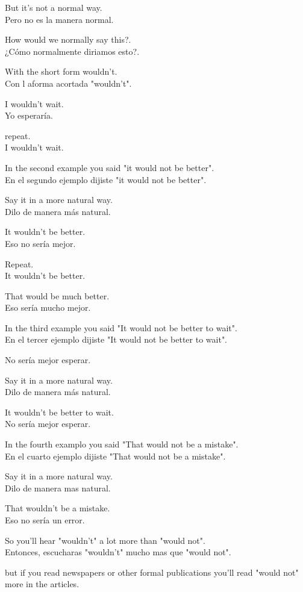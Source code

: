 But it's not a normal way.\\
Pero no es la manera normal.

How would we normally say this?.\\
¿Cómo normalmente diriamos esto?.

With the short form wouldn't.\\
Con l aforma acortada "wouldn't".

I wouldn't wait.\\
Yo esperaría.

repeat.\\
I wouldn't wait.

In the second example you said "it would not be better".\\
En el segundo ejemplo dijiste "it would not be better".

Say it in a more natural way.\\
Dilo de manera más natural.

It wouldn't be better.\\
Eso no sería mejor.

Repeat.\\
It wouldn't be better.

That would be much better.\\
Eso sería mucho mejor.

In the third example you said "It would not be better to wait".\\
En el tercer ejemplo dijiste "It would not be better to wait".

No sería mejor esperar.

Say it in a more natural way.\\
Dilo de manera más natural.

It wouldn't be better to wait.\\
No sería mejor esperar.

In the fourth examplo you said "That would not be a mistake".\\
En el cuarto ejemplo dijiste "That would not be a mistake".

Say it in a more natural way.\\
Dilo de manera mas natural.

That wouldn't be a mistake.\\
Eso no sería un error.

So you'll hear "wouldn't" a lot more than "would not".\\
Entonces, escucharas "wouldn't" mucho mas que "would not".

but if you read newspapers or other formal publications
you'll read "would not" more in the articles.

